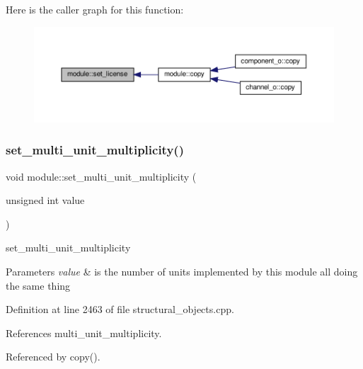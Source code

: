 Here is the caller graph for this function\+:
\nopagebreak
\begin{figure}[H]
\begin{center}
\leavevmode
\includegraphics[width=350pt]{d0/dd3/classmodule_a0555b71dacade36ae76091d28854472c_icgraph}
\end{center}
\end{figure}
\mbox{\label{classmodule_a5468e0331720298e6b68cf73cee8b756}} 
\subsubsection{\texorpdfstring{set\+\_\+multi\+\_\+unit\+\_\+multiplicity()}{set\_multi\_unit\_multiplicity()}}
{\footnotesize\ttfamily void module\+::set\+\_\+multi\+\_\+unit\+\_\+multiplicity (\begin{DoxyParamCaption}\item[{unsigned int}]{value }\end{DoxyParamCaption})}



set\+\_\+multi\+\_\+unit\+\_\+multiplicity 


\begin{DoxyParams}{Parameters}
{\em value} & is the number of units implemented by this module all doing the same thing \\
\hline
\end{DoxyParams}


Definition at line 2463 of file structural\+\_\+objects.\+cpp.



References multi\+\_\+unit\+\_\+multiplicity.



Referenced by copy().

